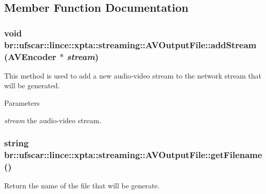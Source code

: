 \subsection{Member Function Documentation}
\hypertarget{classbr_1_1ufscar_1_1lince_1_1xpta_1_1streaming_1_1AVOutputFile_aadb51cfcc435317a17e61cf23823bcef}{
\subsubsection[{addStream}]{\setlength{\rightskip}{0pt plus 5cm}void br::ufscar::lince::xpta::streaming::AVOutputFile::addStream ({\bf AVEncoder} $\ast$ {\em stream})}}
\label{classbr_1_1ufscar_1_1lince_1_1xpta_1_1streaming_1_1AVOutputFile_aadb51cfcc435317a17e61cf23823bcef}


This method is used to add a new audio-\/video stream to the network stream that will be generated. 


\begin{DoxyParams}{Parameters}
\item[{\em stream}]the audio-\/video stream. \end{DoxyParams}
\hypertarget{classbr_1_1ufscar_1_1lince_1_1xpta_1_1streaming_1_1AVOutputFile_aa76efd5719eaf5703eab0a9f6f3d250d}{
\subsubsection[{getFilename}]{\setlength{\rightskip}{0pt plus 5cm}string br::ufscar::lince::xpta::streaming::AVOutputFile::getFilename ()}}
\label{classbr_1_1ufscar_1_1lince_1_1xpta_1_1streaming_1_1AVOutputFile_aa76efd5719eaf5703eab0a9f6f3d250d}


Return the name of the file that will be generate. 



